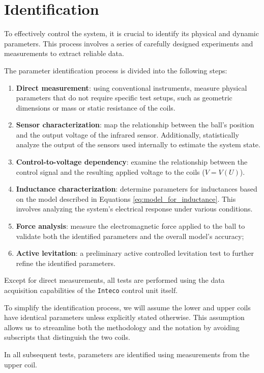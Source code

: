 \section{Identification}
\label{sec:identification}

To effectively control the system, it is crucial to identify its physical and dynamic parameters.
This process involves a series of carefully designed experiments and measurements to extract reliable data.

The parameter identification process is divided into the following steps:

\begin{enumerate}
    \item \textbf{Direct measurement}: using conventional instruments, measure physical parameters that do not require specific test setups, such as geometric dimensions or mass or static resistance of the coils.
    \item \textbf{Sensor characterization}: map the relationship between the ball's position and the output voltage of the infrared sensor. Additionally, statistically analyze the output of the sensors used internally to estimate the system state.
    \item \textbf{Control-to-voltage dependency}: examine the relationship between the control signal and the resulting applied voltage to the coils ($V = V(U)$).
    \item \textbf{Inductance characterization}: determine parameters for inductances based on the model described in Equations \ref{eq:model_for_inductance}. This involves analyzing the system's electrical response under various conditions.
    \item \textbf{Force analysis}: measure the electromagnetic force applied to the ball to validate both the identified parameters and the overall model's accuracy;
    \item \textbf{Active levitation}: a preliminary active controlled levitation test to further refine the identified parameters.
\end{enumerate}

Except for direct measurements, all tests are performed using the data acquisition capabilities of the \texttt{Inteco} control unit itself.

To simplify the identification process, we will assume the lower and upper coils have identical parameters unless explicitly stated otherwise.
This assumption allows us to streamline both the methodology and the notation by avoiding subscripts that distinguish the two coils.

In all subsequent tests, parameters are identified using measurements from the upper coil.







